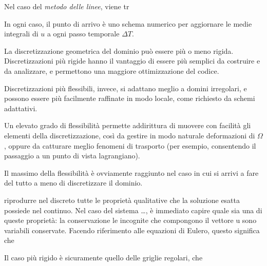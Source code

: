 Nel caso del \emph{metodo delle linee}, 
viene tr


In ogni caso, il punto di arrivo è uno schema numerico
per aggiornare le medie integrali di $u$ a ogni passo temporale $\Delta T$.

\clearpage





La discretizzazione geometrica del dominio può essere più o meno rigida.
Discretizzazioni più rigide hanno il vantaggio di 
essere più semplici da costruire e da analizzare,
e permettono una maggiore ottimizzazione del codice.

Discretizzazioni più flessibili, invece, si adattano
meglio a domini irregolari, e possono essere più facilmente
raffinate in modo locale, come richiesto da schemi adattativi.

Un elevato grado di flessibilità permette addirittura
di muovere con facilità gli elementi della discretizzazione,
così da gestire in modo naturale deformazioni di $\Omega$,
oppure da catturare meglio fenomeni di trasporto
(per esempio, consentendo il passaggio a un punto di vista lagrangiano).

Il massimo della flessibilità è ovviamente raggiunto nel caso
in cui si arrivi a fare del tutto a meno di discretizzare
il dominio.






riprodurre nel discreto tutte le proprietà qualitative che la
soluzione esatta possiede nel continuo.
Nel caso del sistema \dots, è immediato capire quale
sia una di queste proprietà: la conservazione
le incognite che compongono il vettore u sono variabili conservate.
Facendo riferimento alle equazioni di Eulero, questo significa
che 





Il caso più rigido è sicuramente quello delle griglie regolari,
che 






